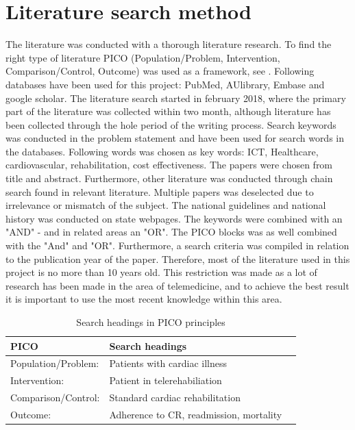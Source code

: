 \section{Literature search method}
\label{literature}

The literature was conducted with a thorough literature research. To find the right type of literature PICO (Population/Problem, Intervention, Comparison/Control, Outcome) was used as a framework, see . 
Following databases have been used for this project: PubMed, AUlibrary, Embase and google scholar.
The literature search started in february 2018, where the primary part of the literature was collected within two month, although literature has been collected through the hole period of the writing process. 
Search keywords was conducted in the problem statement and have been used for search words in the databases. Following words was chosen as key words: ICT, Healthcare, cardiovascular, rehabilitation, cost effectiveness.
The papers were chosen from title and abstract. Furthermore, other literature was conducted through chain search found in relevant literature. Multiple papers was deselected due to irrelevance or mismatch of the subject. The national guidelines and national history was conducted on state webpages. The keywords were combined with an "AND" - and in related areas an "OR". The PICO blocks was as well combined with the "And" and "OR". Furthermore, a search criteria was compiled in relation to the publication year of the paper.  Therefore, most of the literature used in this project is no more than 10 years old. This restriction was made as a lot of research has been made in the area of telemedicine, and to achieve the best result it is important to use the most recent knowledge within this area. 

\begin{table}[H]
\begin{longtabu} to 
    \textbf{PICO} &        \textbf{Search headings} \\[-1ex]
    \midrule
     Population/Problem:   &    Patients with cardiac illness \\ \hline
    Intervention:   &        Patient in telerehabiliation \\ \hline
    Comparison/Control:    &        Standard cardiac rehabilitation \\ \hline
    Outcome:    &        Adherence to CR, readmission, mortality 
    \newline
   \end{longtabu}
\caption{Search headings in PICO principles}
\label{PICO}
\end{table}

